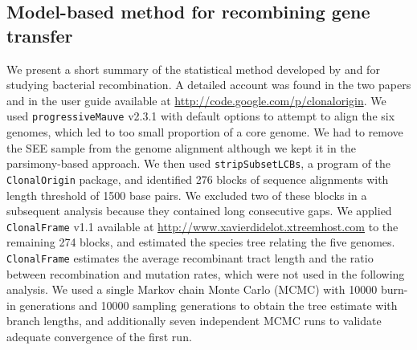 \documentclass[english]{article}
\begin{document}
\subsection{Model-based method for recombining gene transfer}

We present a short summary of the statistical method developed by
\citet{Didelot2007} and \citet{Didelot2010} for studying bacterial
recombination. A detailed account was found in the two papers and in the user
guide available at \url{http://code.google.com/p/clonalorigin}.  We used
\texttt{progressiveMauve} v2.3.1 \citep{Darling2004,Darling2010} with default
options to attempt to align the six genomes, which led to too small proportion
of a core genome. We had to remove the SEE sample from the genome alignment
although we kept it in the parsimony-based approach.  We then used
\texttt{stripSubsetLCBs}, a program of the \texttt{ClonalOrigin} package, and
identified 276 blocks of sequence alignments with length threshold of 1500 base
pairs.  We excluded two of these blocks in a subsequent analysis because they
contained long consecutive gaps.  We applied \texttt{ClonalFrame} v1.1 available
at \url{http://www.xavierdidelot.xtreemhost.com} to the remaining 274 blocks,
and estimated the species tree relating the five genomes. \texttt{ClonalFrame}
estimates the average recombinant tract length and the ratio between
recombination and mutation rates, which were not used in the following analysis.
We used a single Markov chain Monte Carlo (MCMC) with 10000 burn-in generations
and 10000 sampling generations to obtain the tree estimate with branch lengths,
and additionally seven independent MCMC runs to validate adequate convergence of
the first run.
\end{document}
